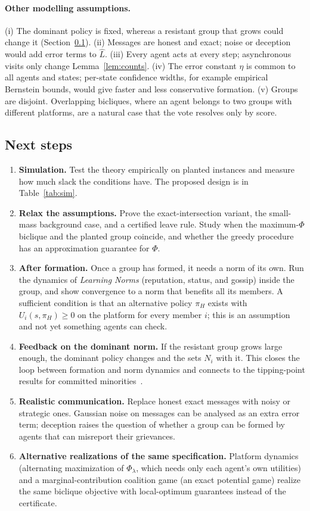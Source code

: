 \documentclass[11pt]{article}
\theoremstyle{plain}
\theoremstyle{definition}
\theoremstyle{remark}
\begin{document}
\paragraph{Other modelling assumptions.}
(i) The dominant policy is fixed, whereas a resistant group that grows could change it (Section~\ref{sec:next}). (ii) Messages are honest and exact; noise or deception would add error terms to $\hat L$. (iii) Every agent acts at every step; asynchronous visits only change Lemma~\ref{lem:counts}.
(iv) The error constant $\eta$ is common to all agents and states; per-state confidence widths, for example empirical Bernstein bounds, would give faster and less conservative formation.
(v) Groups are disjoint. Overlapping bicliques, where an agent belongs to two groups with different platforms, are a natural case that the vote resolves only by score.
 
\subsection{Next steps}\label{sec:next}
\begin{enumerate}[label=\textbf{\arabic*.},leftmargin=2em,itemsep=4pt]
    \item \textbf{Simulation.} Test the theory empirically on planted instances and measure how much slack the conditions have. The proposed design is in Table~\ref{tab:sim}.
    \item \textbf{Relax the assumptions.} Prove the exact-intersection variant, the small-mass background case, and a certified leave rule. Study when the maximum-$\Phi$ biclique and the planted group coincide, and whether the greedy procedure has an approximation guarantee for $\Phi$.
    \item \textbf{After formation.} Once a group has formed, it needs a norm of its own. Run the dynamics of \textit{Learning Norms} (reputation, status, and gossip) inside the group, and show convergence to a norm that benefits all its members. A sufficient condition is that an alternative policy $\pi_H$ exists with $U_i(s,\pi_H)\ge 0$ on the platform for every member $i$; this is an assumption and not yet something agents can check.
    \item \textbf{Feedback on the dominant norm.} If the resistant group grows large enough, the dominant policy changes and the sets $N_i$ with it. This closes the loop between formation and norm dynamics and connects to the tipping-point results for committed minorities~\cite{centola}.
    \item \textbf{Realistic communication.} Replace honest exact messages with noisy or strategic ones. Gaussian noise on messages can be analysed as an extra error term; deception raises the question of whether a group can be formed by agents that can misreport their grievances.
    \item \textbf{Alternative realizations of the same specification.} Platform dynamics (alternating maximization of $\Phi_\lambda$, which needs only each agent's own utilities) and a marginal-contribution coalition game (an exact potential game) realize the same biclique objective with local-optimum guarantees instead of the certificate.
\end{enumerate}
 
\end{document}
